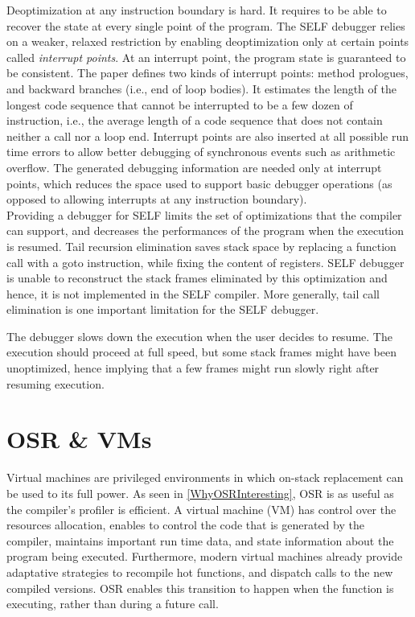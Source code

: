 Deoptimization at any instruction boundary is hard. 
It requires to be able to recover the state at every single point of the program.
The SELF debugger relies on a weaker, relaxed restriction by enabling deoptimization only at certain points called \textit{interrupt points}. 
At an interrupt point, the program state is guaranteed to be consistent. 
The paper\cite{holzle1992debugging} defines two kinds of interrupt points: method prologues, and backward branches (i.e., end of loop bodies).
It estimates the length of the longest code sequence that cannot be interrupted to be a few dozen of instruction, i.e., the average length of a code sequence that does not contain neither a call nor a loop end.
Interrupt points are also inserted at all possible run time errors to allow better debugging of synchronous events such as arithmetic overflow. 
The generated debugging information are needed only at interrupt points, which reduces the space used to support basic debugger operations (as opposed to allowing interrupts at any instruction boundary).\\

Providing a debugger for SELF limits the set of optimizations that the compiler can support, and decreases the performances of the program when the execution is resumed. 
Tail recursion elimination saves stack space by replacing a function call with a goto instruction, while fixing the content of registers.
SELF debugger is unable to reconstruct the stack frames eliminated by this optimization and hence, it is not implemented in the SELF compiler.
More generally, tail call elimination is one important limitation for the SELF debugger.

The debugger slows down the execution when the user decides to resume. 
The execution should proceed at full speed, but some stack frames might have been unoptimized, hence implying that a few frames might run slowly right after resuming execution.\\

\section{OSR \& VMs}
Virtual machines are privileged environments in which on-stack replacement can be used to its full power.
As seen in \ref{WhyOSRInteresting}, OSR is as useful as the compiler's profiler is efficient.
A virtual machine (VM) has control over the resources allocation, enables to control the code that is generated by the compiler, maintains important run time data, and state information about the program being executed.
Furthermore, modern virtual machines already provide adaptative strategies to recompile hot functions\cite{arnold2000adaptive, paleczny2001java, holzle1994third, suganuma2001dynamic}, and dispatch calls to the new compiled versions.
OSR enables this transition to happen when the function is executing, rather than during a future call.\\

